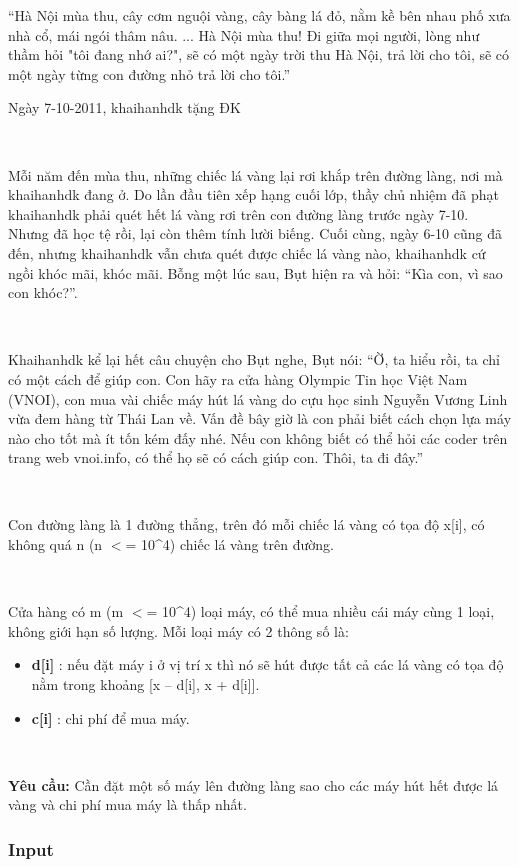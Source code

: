 

“Hà Nội mùa thu, cây cơm nguội vàng, cây bàng lá đỏ, nằm kề bên nhau phố xưa nhà cổ, mái ngói thâm nâu. ... Hà Nội mùa thu! Đi giữa mọi người, lòng như thầm hỏi "tôi đang nhớ ai?", sẽ có một ngày trời thu Hà Nội, trả lời cho tôi, sẽ có một ngày từng con đường nhỏ trả lời cho tôi.”

Ngày 7-10-2011, khaihanhdk tặng ĐK

 

Mỗi năm đến mùa thu, những chiếc lá vàng lại rơi khắp trên đường làng, nơi mà khaihanhdk đang ở. Do lần đầu tiên xếp hạng cuối lớp, thầy chủ nhiệm đã phạt khaihanhdk phải quét hết lá vàng rơi trên con đường làng trước ngày 7-10. Nhưng đã học tệ rồi, lại còn thêm tính lười biếng. Cuối cùng, ngày 6-10 cũng đã đến, nhưng khaihanhdk vẫn chưa quét được chiếc lá vàng nào, khaihanhdk cứ ngồi khóc mãi, khóc mãi. Bỗng một lúc sau, Bụt hiện ra và hỏi: “Kìa con, vì sao con khóc?”.

 

Khaihanhdk kể lại hết câu chuyện cho Bụt nghe, Bụt nói: “Ờ, ta hiểu rồi, ta chỉ có một cách để giúp con. Con hãy ra cửa hàng Olympic Tin học Việt Nam (VNOI), con mua vài chiếc máy hút lá vàng do cựu học sinh Nguyễn Vương Linh vừa đem hàng từ Thái Lan về. Vấn đề bây giờ là con phải biết cách chọn lựa máy nào cho tốt mà ít tốn kém đấy nhé. Nếu con không biết có thể hỏi các coder trên trang web vnoi.info, có thể họ sẽ có cách giúp con. Thôi, ta đi đây.”

 

Con đường làng là 1 đường thẳng, trên đó mỗi chiếc lá vàng có tọa độ x[i], có không quá n (n $<$= 10\textasciicircum4) chiếc lá vàng trên đường.

 

Cửa hàng có m (m $<$= 10\textasciicircum4) loại máy, có thể mua nhiều cái máy cùng 1 loại, không giới hạn số lượng. Mỗi loại máy có 2 thông số là:
\begin{itemize}
	\item \textbf{d[i] } : nếu đặt máy i ở vị trí x thì nó sẽ hút được tất cả các lá vàng có tọa độ nằm trong khoảng [x – d[i], x + d[i]].
	\item \textbf{c[i] } : chi phí để mua máy.
\end{itemize}

 

\textbf{Yêu cầu: } Cần đặt một số máy lên đường làng sao cho các máy hút hết được lá vàng và chi phí mua máy là thấp nhất.

\subsubsection{Input}

